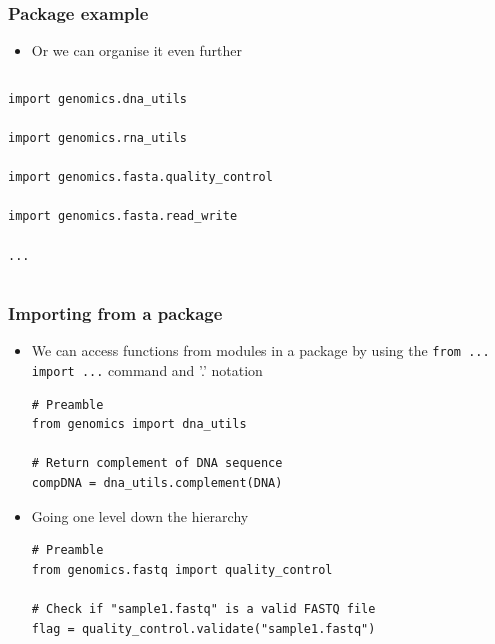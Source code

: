 \documentclass[xcolor=table]{beamer}
\begin{document}
\begin{frame}[fragile]
\frametitle{Package example}

\begin{itemize}
	\item Or we can organise it even further
\end{itemize}


\begin{columns}


\begin{lstlisting}[style=python]
import genomics.dna_utils

import genomics.rna_utils

import genomics.fasta.quality_control

import genomics.fasta.read_write

...
\end{lstlisting}
\end{columns}

\end{frame}

\begin{frame}[fragile]
\frametitle{Importing from a package}

\begin{itemize}

\item<1-> We can access functions from modules in a package by using the  
\texttt{from ... import ...} command and '.' notation
\begin{lstlisting}[style=python]
# Preamble
from genomics import dna_utils

# Return complement of DNA sequence
compDNA = dna_utils.complement(DNA)
\end{lstlisting}

\item<2-> Going one level down the hierarchy
\begin{lstlisting}[style=python]
# Preamble
from genomics.fastq import quality_control

# Check if "sample1.fastq" is a valid FASTQ file
flag = quality_control.validate("sample1.fastq")
\end{lstlisting}

\end{itemize}

\end{frame}
\end{document}
